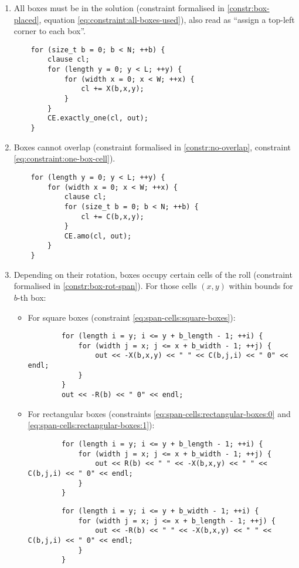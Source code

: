 \begin{enumerate}
	\item All boxes must be in the solution (constraint formalised in
	\ref{constr:box-placed}, equation \ref{eq:constraint:all-boxes-used}),
	also read as ``assign a top-left corner to each box''.
    
	{\NOINDENT \begin{lstlisting}
	for (size_t b = 0; b < N; ++b) {
		clause cl;
		for (length y = 0; y < L; ++y) {
			for (width x = 0; x < W; ++x) {
				cl += X(b,x,y);
			}
		}
		CE.exactly_one(cl, out);
	}
	\end{lstlisting}}
    
	\item Boxes cannot overlap (constraint formalised in
	\ref{constr:no-overlap}, constraint \ref{eq:constraint:one-box-cell}).
    
	{\NOINDENT \begin{lstlisting}
	for (length y = 0; y < L; ++y) {
		for (width x = 0; x < W; ++x) {
			clause cl;
			for (size_t b = 0; b < N; ++b) {
				cl += C(b,x,y);
			}
			CE.amo(cl, out);
		}
	}
	\end{lstlisting}}
    
	\item Depending on their rotation, boxes occupy certain cells of the roll
	(constraint formalised in \ref{constr:box-rot-span}). For those cells $(x,y)$ within
	bounds for $b$-th box:

	\begin{itemize}
		\item For square boxes (constraint \ref{eq:span-cells:square-boxes}):
		{\NOINDENT \begin{lstlisting}
		for (length i = y; i <= y + b_length - 1; ++i) {
			for (width j = x; j <= x + b_width - 1; ++j) {
				out << -X(b,x,y) << " " << C(b,j,i) << " 0" << endl;
			}
		}
		out << -R(b) << " 0" << endl;
		\end{lstlisting}}
		
		\item For rectangular boxes (constraints \ref{eq:span-cells:rectangular-boxes:0} and
		\ref{eq:span-cells:rectangular-boxes:1}):
		{\NOINDENT \begin{lstlisting}
		for (length i = y; i <= y + b_length - 1; ++i) {
			for (width j = x; j <= x + b_width - 1; ++j) {
				out << R(b) << " " << -X(b,x,y) << " " << C(b,j,i) << " 0" << endl;
			}
		}
		\end{lstlisting}}
		{\NOINDENT \begin{lstlisting}
		for (length i = y; i <= y + b_width - 1; ++i) {
			for (width j = x; j <= x + b_length - 1; ++j) {
				out << -R(b) << " " << -X(b,x,y) << " " << C(b,j,i) << " 0" << endl;
			}
		}
		\end{lstlisting}}
	\end{itemize}
    

\end{enumerate}
